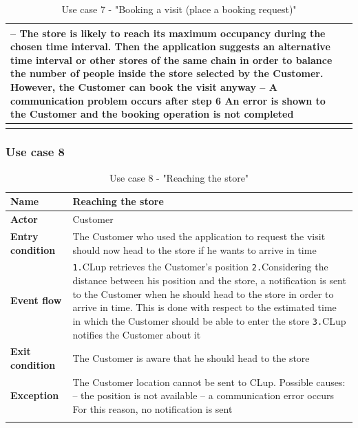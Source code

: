 \documentclass[a4paper,oneside,11pt]{book}   %
\begin{document}
\begin{longtable}[c] { |>{\bfseries{}}C{0.25\textwidth}|V{0.55\textwidth}| }
        -- The store is likely to reach its maximum occupancy during the chosen time interval. Then the application suggests an alternative time interval or other stores of the same chain in order to balance the number of people inside the store selected by the Customer. However, the Customer can book the visit anyway \newline
        -- A communication problem occurs after step 6 \newline
        An error is shown to the Customer and the booking operation is not completed \\
        \hline
    \caption{Use case 7 - "Booking a visit (place a booking request)"}
    \label{table:use_case_07}
    \end{longtable}
    
    \subsubsection{Use case 8}
    \begin{longtable}[c] { |>{\bfseries{}}C{0.25\textwidth}|V{0.55\textwidth}| }
        \hline
        Name            & Reaching the store \\ \hline
        Actor           & Customer \\ \hline
        Entry condition & The Customer who used the application to request the visit should now head to the store if he wants to arrive in time  \\ \hline
        Event flow      & 
        \texttt{1.}CLup retrieves the Customer’s position \newline
        \texttt{2.}Considering the distance between his position and the store, a notification is sent to the Customer when he should head to the store in order to arrive in time. This is done with respect to the estimated time in which the Customer should be able to enter the store \newline
        \texttt{3.}CLup notifies the Customer about it \newline \\ \hline
        Exit condition  & The Customer is aware that he should head to the store \\ \hline
        Exception       & The Customer location cannot be sent to CLup. Possible causes: \newline
        -- the position is not available \newline
        -- a communication error occurs \newline
        For this reason, no notification is sent \\
        \hline
    \caption{Use case 8 - "Reaching the store"}
    \label{table:use_case_08}
    \end{longtable}
    
\end{document}
